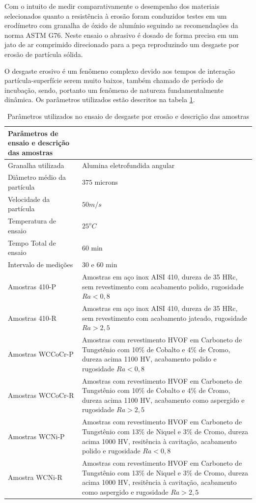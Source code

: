 Com o intuito de medir comparativamente o desempenho dos materiais selecionados
quanto a resistência à erosão foram conduzidos testes em um erodímetro com
granalha de óxido de alumínio seguindo as recomendações da norma ASTM G76.
Neste ensaio o abrasivo é dosado de forma precisa em um jato de ar comprimido
direcionado para a peça reproduzindo um desgaste por erosão de partícula
sólida.

O desgaste erosivo é um fenômeno complexo devido aos tempos de interação
partícula-superfície serem muito baixos, também chamado de período de
incubação, sendo, portanto um fenômeno de natureza fundamentalmente dinâmica.
Os parâmetros utilizados estão descritos na tabela \ref{tab:param_erosao}.


\begin{table}[H]
\centering
\begin{tabular}{|l|p{8cm}|}
 Parâmetros de ensaio e descrição das amostras  \\ \hline
 Granalha utilizada          &  Alumina eletrofundida angular  \\ \hline
 Diâmetro médio da partícula &  $375$ microns \\ \hline
 Velocidade da partícula     &  $50 m/s$ \\ \hline
 Temperatura de ensaio       &  $25^o C$ \\ \hline
 Tempo Total de ensaio       &  60 min \\ \hline
 Intervalo de medições       &  30 e 60 min \\ \hline
 Amostras 410-P              & Amostras em  aço inox AISI 410, dureza de 35 HRc,
 sem revestimento com acabamento polido, rugosidade $Ra<0,8$ \\ \hline
 Amostras 410-R              &  Amostras em aço inox AISI 410, dureza de
 35 HRc, sem revestimento com acabamento jateado, rugosidade $Ra>2,5$ \\ \hline
 Amostras WCCoCr-P           & Amostras com revestimento HVOF em Carboneto de
 Tungstênio com 10\% de Cobalto e 4\% de Cromo, dureza acima 1100 HV, acabamento
 polido e rugosidade $Ra<0,8$ \\ \hline
 Amostras WCCoCr-R           & Amostras com revestimento HVOF em Carboneto de
 Tungstênio com 10\% de Cobalto e 4\% de Cromo, dureza acima 1100 HV, acabamento
 como aspergido e rugosidade $Ra>2,5$ \\ \hline
 Amostras WCNi-P             & Amostras com revestimento HVOF em Carboneto de
 Tungstênio com 13\% de Niquel e 3\% de Cromo, dureza acima 1000 HV, resitência
 à cavitação, acabamento polido e rugosidade $Ra<0,8$ \\ \hline
 Amostra WCNi-R              &  Amostras com revestimento HVOF em Carboneto de
 Tungstênio com 13\% de Niquel e 3\% de Cromo, dureza acima 1000 HV, resitência
 à cavitação, acabamento como aspergido e rugosidade $Ra>2,5$ 
\end{tabular}
\caption{Parâmetros utilizados no ensaio de desgaste por erosão e descrição das
amostras}
\label{tab:param_erosao}

\end{table}

